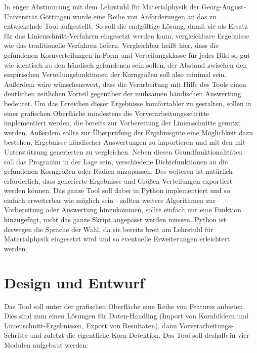 \documentclass[
  12pt,
  openany]{book}
\begin{document}
In enger Abstimmung mit dem Lehrstuhl für Materialphysik der Georg-August-Universität Göttingen wurde eine Reihe von Anforderungen an das zu entwickelnde Tool aufgestellt.
So soll die endgültige Lösung, damit sie als Ersatz für das Linienschnitt-Verfahren eingesetzt werden kann, vergleichbare Ergebnisse wie das traditionelle Verfahren liefern. Vergleichbar heißt hier, dass die gefundenen Kornverteilungen in Form und Verteilungsklasse für jedes Bild so gut wie identisch zu den händisch gefundenen sein sollen, der Abstand zwischen den empirischen Verteilungsfunktionen der Korngrößen soll also minimal sein.
Außerdem wäre wünschenswert, dass die Verarbeitung mit Hilfe des Tools einen deutlichen zeitlichen Vorteil gegenüber der mühsamen händischen Auswertung bedeutet. \newline
Um das Erreichen dieser Ergebnisse komfortabler zu gestalten, sollen in einer grafischen Oberfläche mindestens die Vorverarbeitungsschritte implementiert werden, die bereits zur Vorbereitung der Linienschnitte genutzt werden. Außerdem sollte zur Überprüfung der Ergebnisgüte eine Möglichkeit dazu bestehen, Ergebnisse händischer Auswertungen zu importieren und mit den mit Unterstützung generierten zu vergleichen.
Neben diesen Grundfunktionalitäten soll das Programm in der Lage sein, verschiedene Dichtefunktionen an die gefundenen Korngrößen oder Radien anzupassen. Des weiteren ist natürlich erforderlich, dass generierte Ergebnisse und Größen-Verteilungen exportiert werden können.
Das ganze Tool soll dabei in Python implementiert und so einfach erweiterbar wie möglich sein - sollten weitere Algorithmen zur Vorbereitung oder Auswertung hinzukommen, sollte einfach nur eine Funktion hinzugefügt, nicht das ganze Skript angepasst werden müssen. Python ist deswegen die Sprache der Wahl, da sie bereits breit am Lehrstuhl für Materialphysik eingesetzt wird und so eventuelle Erweiterungen erleichtert werden.

\hypertarget{design-und-entwurf}{%
\chapter{Design und Entwurf}\label{design-und-entwurf}}

Das Tool soll unter der grafischen Oberfläche eine Reihe von Features anbieten. Dies sind zum einen Lösungen für Daten-Handling (Import von Kornbildern und Linienschnitt-Ergebnissen, Export von Resultaten), dann Vorverarbeitungs-Schritte und zuletzt die eigentliche Korn-Detektion. Das Tool soll deshalb in vier Modulen aufgebaut werden:
\end{document}
